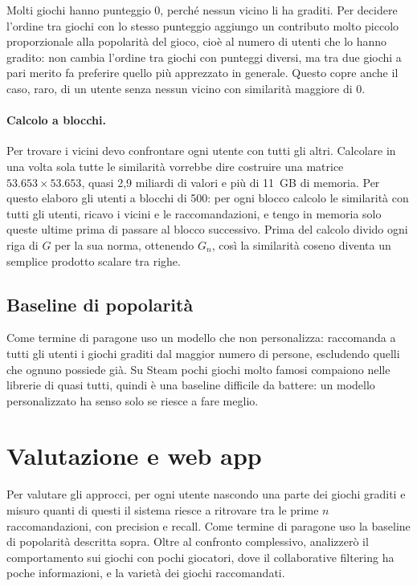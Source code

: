 \documentclass[11pt,a4paper]{article}
\begin{document}
Molti giochi hanno punteggio 0, perché nessun vicino li ha graditi. Per
decidere l'ordine tra giochi con lo stesso punteggio aggiungo un contributo
molto piccolo proporzionale alla popolarità del gioco, cioè al numero di utenti
che lo hanno gradito: non cambia l'ordine tra giochi con punteggi diversi, ma
tra due giochi a pari merito fa preferire quello più apprezzato in generale.
Questo copre anche il caso, raro, di un utente senza nessun vicino con
similarità maggiore di 0.

\paragraph{Calcolo a blocchi.} Per trovare i vicini devo confrontare ogni
utente con tutti gli altri. Calcolare in una volta sola tutte le similarità
vorrebbe dire costruire una matrice $53.653 \times 53.653$, quasi 2,9 miliardi
di valori e più di 11~GB di memoria. Per questo elaboro gli utenti a blocchi di
500: per ogni blocco calcolo le similarità con tutti gli utenti, ricavo i vicini
e le raccomandazioni, e tengo in memoria solo queste ultime prima di passare al
blocco successivo. Prima del calcolo divido ogni riga di $G$ per la sua norma, ottenendo $G_n$,
così la similarità coseno diventa un semplice prodotto scalare tra righe.

\subsection{Baseline di popolarità}

Come termine di paragone uso un modello che non personalizza: raccomanda a
tutti gli utenti i giochi graditi dal maggior numero di persone, escludendo
quelli che ognuno possiede già. Su Steam pochi giochi molto famosi compaiono
nelle librerie di quasi tutti, quindi è una baseline difficile da battere: un
modello personalizzato ha senso solo se riesce a fare meglio.

\section{Valutazione e web app}

Per valutare gli approcci, per ogni utente nascondo una parte dei giochi graditi
e misuro quanti di questi il sistema riesce a ritrovare tra le prime $n$
raccomandazioni, con precision e recall. Come termine di paragone uso la
baseline di popolarità descritta sopra. Oltre al confronto complessivo,
analizzerò il comportamento sui giochi con pochi giocatori, dove il
collaborative filtering ha poche informazioni, e la varietà dei giochi
raccomandati.
\end{document}
